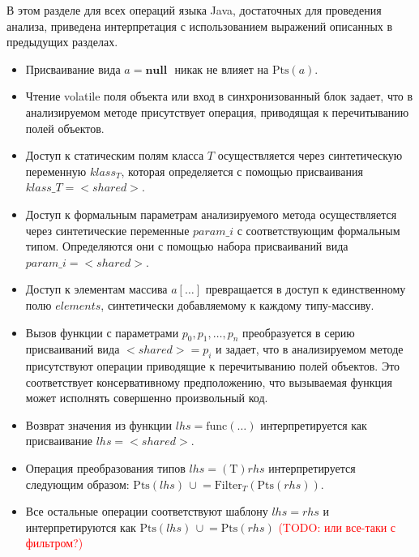 \documentclass[14pt,titlepage]{extarticle}
\newcommand{\NULL}{\textbf{null }}
\newcommand{\Pts}[1]{\textrm{Pts}(#1)}
\newcommand{\Filter}[2]{\textrm{Filter}_{#1}(#2)}
\newcommand{\cupe}{\,\cup\!\!=}
\newcommand{\todo}[1]{\textcolor{red}{(\eng{TODO}: #1)}}
\newcommand{\eng}[1]{{\English#1}}
\begin{document}
        В этом разделе для всех операций языка Java, достаточных для
        проведения анализа, приведена интерпретация с использованием выражений
        описанных в предыдущих разделах.
        \begin{itemize}
          \item Присваивание вида $a = \NULL$ никак не влияет на $\Pts{a}$.
          \item Чтение \eng{volatile} поля объекта или вход в синхронизованный
                блок задает, что в анализируемом методе присутствует операция,
                приводящая к перечитыванию полей объектов.
          \item Доступ к статическим полям класса $T$ осуществляется через
                синтетическую переменную $klass_T$, которая определяется с
                помощью присваивания $klass\_T = {<}shared{>}$.
          \item Доступ к формальным параметрам анализируемого метода
                осуществляется через синтетические переменные $param\_i$ с
                соответствующим формальным типом.
                Определяются они с помощью набора присваиваний вида
                $param\_i = {<}shared{>}$.
          \item Доступ к элементам массива $a[\ldots]$ превращается в доступ к
                единственному полю $elements$, синтетически добавляемому к
                каждому типу-массиву.
          \item Вызов функции с параметрами $p_0, p_1, \ldots, p_n$
                преобразуется в серию присваиваний вида ${<}shared{>} = p_i$ и
                задает, что в анализируемом методе присутствуют операции
                приводящие к перечитыванию полей объектов. Это соответствует
                консервативному предположению, что вызываемая функция может
                исполнять совершенно произвольный код.
          \item Возврат значения из функции $lhs = \textrm{func}(\ldots)$
                интерпретируется как присваивание $lhs = {<}shared{>}$.
          \item Операция преобразования типов $lhs = (\textrm{T})rhs$
                интерпретируется следующим образом:
                $\Pts{lhs} \cupe \Filter{T}{\Pts{rhs}}$.
          \item Все остальные операции соответствуют шаблону $lhs = rhs$ и
                интерпретируются как
                $\Pts{lhs} \cupe \Pts{rhs}$ \todo{или все-таки с фильтром?}
        \end{itemize}
\end{document}
